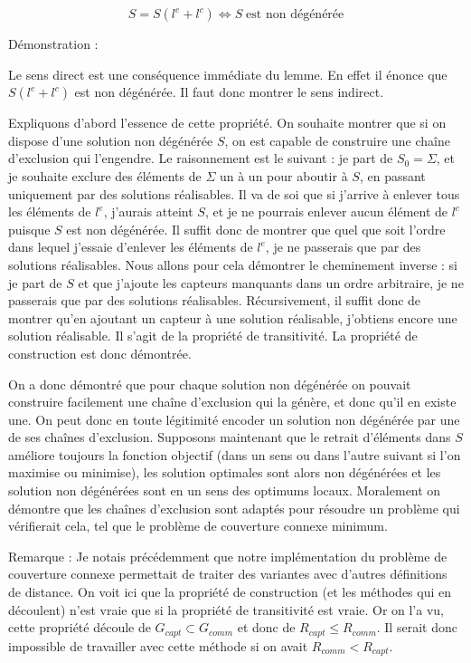 \documentclass[12pt,a4paper]{article}
\begin{document}
\[S=S(l^e+l^c) \Leftrightarrow S\;\text{est non dégénérée}\]


Démonstration :

Le sens direct est une conséquence immédiate du lemme. En effet il énonce que $S(l^e+l^c)$ est non dégénérée. Il faut donc montrer le sens indirect.

Expliquons d'abord l'essence de cette propriété. On souhaite montrer que si on dispose d'une solution non dégénérée $S$, on est capable de construire une chaîne d'exclusion qui l'engendre. Le raisonnement est le suivant : je part de $S_0=\Sigma$, et je souhaite exclure des éléments de $\Sigma$ un à un pour aboutir à $S$, en passant uniquement par des solutions réalisables. Il va de soi que si j'arrive à enlever tous les éléments de $l^e$, j'aurais atteint $S$, et je ne pourrais enlever aucun élément de $l^c$ puisque $S$ est non dégénérée. Il suffit donc de montrer que quel que soit l'ordre dans lequel j'essaie d'enlever les éléments de $l^e$, je ne passerais que par des solutions réalisables. Nous allons pour cela démontrer le cheminement inverse :  si je part de $S$ et que j'ajoute les capteurs manquants dans un ordre arbitraire, je ne passerais que par des solutions réalisables. Récursivement, il suffit donc de montrer qu'en ajoutant un capteur à une solution réalisable, j'obtiens encore une solution réalisable. Il s'agit de la propriété de transitivité. La propriété de construction est donc démontrée.



On a donc démontré que pour chaque solution non dégénérée on pouvait construire facilement une chaîne d'exclusion qui la génère, et donc qu'il en existe une. On peut donc en toute légitimité encoder un solution non dégénérée par une de ses chaînes d'exclusion. Supposons maintenant que le retrait d'éléments dans $S$ améliore toujours la fonction objectif (dans un sens ou dans l'autre suivant si l'on maximise ou minimise), les solution optimales sont alors non dégénérées et les solution non dégénérées sont en un sens des optimums locaux. Moralement on démontre que les chaînes d'exclusion sont adaptés pour résoudre un problème qui vérifierait cela, tel que le problème de couverture connexe minimum.  


Remarque : Je notais précédemment que notre implémentation du problème de couverture connexe permettait de traiter des variantes avec d'autres définitions de distance. On voit ici que la propriété de construction (et les méthodes qui en découlent) n'est vraie que si la propriété de transitivité est vraie. Or on l'a vu, cette propriété découle de $G_{capt}\subset G_{comm}$ et donc de $R_{capt}\leq R_{comm}$. Il serait donc impossible de travailler avec cette méthode si on avait $R_{comm}<R_{capt}$.
\end{document}
